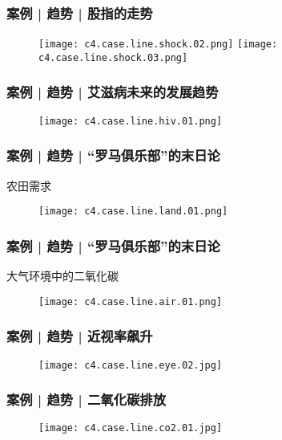 \begin{frame}
  \frametitle{案例 | 趋势 | 股指的走势}
  \begin{figure}
    \centering
    \texttt{[image: c4.case.line.shock.02.png]}\quad
    \texttt{[image: c4.case.line.shock.03.png]}
  \end{figure}
\end{frame}

\begin{frame}
  \frametitle{案例 | 趋势 | 艾滋病未来的发展趋势}
  \begin{figure}
    \centering
    \texttt{[image: c4.case.line.hiv.01.png]}
  \end{figure}
\end{frame}

\begin{frame}
  \frametitle{案例 | 趋势 | “罗马俱乐部”的末日论}
  \begin{block}{农田需求}
    \begin{figure}
      \centering
      \texttt{[image: c4.case.line.land.01.png]}
    \end{figure}
  \end{block}
\end{frame}

\begin{frame}
  \frametitle{案例 | 趋势 | “罗马俱乐部”的末日论}
  \begin{block}{大气环境中的二氧化碳}
    \begin{figure}
      \centering
      \texttt{[image: c4.case.line.air.01.png]}
    \end{figure}
  \end{block}
\end{frame}

\begin{frame}
  \frametitle{案例 | 趋势 | 近视率飙升}
    \begin{figure}
      \centering
      \texttt{[image: c4.case.line.eye.02.jpg]}
    \end{figure}
\end{frame}

\begin{frame}
  \frametitle{案例 | 趋势 | 二氧化碳排放}
    \begin{figure}
      \centering
      \texttt{[image: c4.case.line.co2.01.jpg]}
    \end{figure}
\end{frame}

